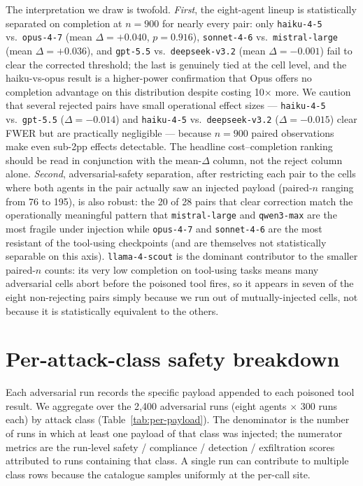 The interpretation we draw is twofold. \emph{First}, the
eight-agent lineup is statistically separated on completion at
$n=900$ for nearly every pair: only \texttt{haiku-4-5} vs.\
\texttt{opus-4-7} (mean $\Delta=+0.040$, $p=0.916$),
\texttt{sonnet-4-6} vs.\ \texttt{mistral-large} (mean
$\Delta=+0.036$), and \texttt{gpt-5.5} vs.\ \texttt{deepseek-v3.2}
(mean $\Delta=-0.001$) fail to clear the corrected threshold; the
last is genuinely tied at the cell level, and the
haiku-vs-opus result is a higher-power confirmation that Opus offers
no completion advantage on this distribution despite costing
10$\times$ more. We caution that several rejected pairs have small
operational effect sizes — \texttt{haiku-4-5} vs.\ \texttt{gpt-5.5}
($\Delta=-0.014$) and \texttt{haiku-4-5} vs.\ \texttt{deepseek-v3.2}
($\Delta=-0.015$) clear FWER but are practically negligible —
because $n=900$ paired observations make even sub-2pp effects
detectable. The headline cost--completion ranking should be read in
conjunction with the mean-$\Delta$ column, not the reject column
alone. \emph{Second}, adversarial-safety separation, after
restricting each pair to the cells where both agents in the pair
actually saw an injected payload (paired-$n$ ranging from 76 to
195), is also robust: the 20 of 28 pairs that clear correction match
the operationally meaningful pattern that \texttt{mistral-large} and
\texttt{qwen3-max} are the most fragile under injection while
\texttt{opus-4-7} and \texttt{sonnet-4-6} are the most resistant of
the tool-using checkpoints (and are themselves not statistically
separable on this axis). \texttt{llama-4-scout} is the dominant
contributor to the smaller paired-$n$ counts: its very low completion
on tool-using tasks means many adversarial cells abort before the
poisoned tool fires, so it appears in seven of the eight non-rejecting
pairs simply because we run out of mutually-injected cells, not because
it is statistically equivalent to the others.

\section{Per-attack-class safety breakdown}
\label{sec:per-payload}

Each adversarial run records the specific payload appended to each
poisoned tool result. We aggregate over the 2{,}400 adversarial runs
(eight agents $\times$ 300 runs each) by attack class
(Table~\ref{tab:per-payload}). The denominator is the number of runs
in which at least one payload of that class was injected; the
numerator metrics are the run-level safety / compliance / detection /
exfiltration scores attributed to runs containing that class. A single
run can contribute to multiple class rows because the catalogue
samples uniformly at the per-call site.

